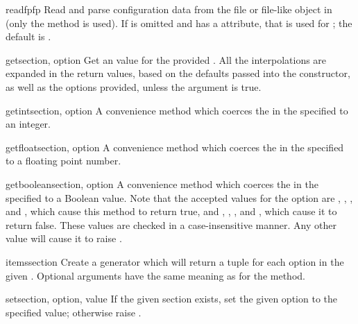 \begin{methoddesc}{readfp}{fp}
Read and parse configuration data from the file or file-like object in
 (only the  method is used).  If
 is omitted and  has a  attribute,
that is used for ; the default is .
\end{methoddesc}

\begin{methoddesc}{get}{section, option}
Get an  value for the provided .  All the
\character{\%} interpolations are expanded in the return values, based on
the defaults passed into the constructor, as well as the options
 provided, unless the  argument is true.
\end{methoddesc}

\begin{methoddesc}{getint}{section, option}
A convenience method which coerces the  in the specified
 to an integer.
\end{methoddesc}

\begin{methoddesc}{getfloat}{section, option}
A convenience method which coerces the  in the specified
 to a floating point number.
\end{methoddesc}

\begin{methoddesc}{getboolean}{section, option}
A convenience method which coerces the  in the specified
 to a Boolean value.  Note that the accepted values
for the option are , , , and ,
which cause this method to return true, and , ,
, and , which cause it to return false.  These
values are checked in a case-insensitive manner.  Any other value will
cause it to raise .
\end{methoddesc}

\begin{methoddesc}{items}{section}
Create a generator which will return a tuple  for
each option in the given . Optional arguments have the
same meaning as for the  method.
\end{methoddesc}

\begin{methoddesc}{set}{section, option, value}
If the given section exists, set the given option to the specified value;
otherwise raise .
\end{methoddesc}

